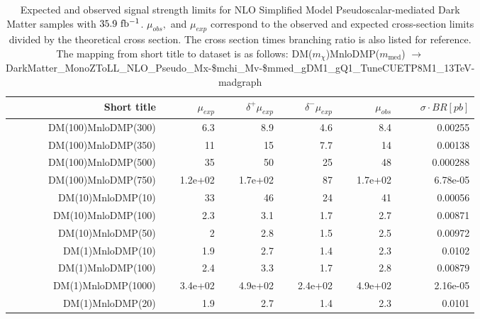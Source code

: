 \begin{table}[hbtp]
  \caption{
    Expected and observed signal strength limits for NLO Simplified Model Pseudoscalar-mediated Dark Matter samples with $35.9~\mathrm{fb^{-1}}$.
    $\mu_{obs},$ and $\mu_{exp}$ correspond to the observed and expected cross-section limits divided by the theoretical cross section.
    The cross section times branching ratio is also listed for reference.
    The mapping from short title to dataset is as follows:
    {\footnotesize DM($m_\chi$)MnloDMP($m_\mathrm{med}$) $\rightarrow$ DarkMatter\_MonoZToLL\_NLO\_Pseudo\_Mx-\$mchi\_Mv-\$mmed\_gDM1\_gQ1\_TuneCUETP8M1\_13TeV-madgraph }
  }
  \label{tab:pseudoscalar_limits}
  \begin{center}
{\footnotesize
  \begin{tabular}{rrrrrr}
\hline 
Short title               & $\mu_{exp}$  & $\delta^{+}\mu_{exp}$ & $\delta^{-}\mu_{exp}$ & $\mu_{obs}$  & $\sigma \cdot BR [pb]$ \\
\hline
DM(100)MnloDMP(300)       & 6.3          & 8.9          & 4.6          & 8.4          & 0.00255         \\
DM(100)MnloDMP(350)       & 11           & 15           & 7.7          & 14           & 0.00138         \\
DM(100)MnloDMP(500)       & 35           & 50           & 25           & 48           & 0.000288        \\
DM(100)MnloDMP(750)       & 1.2e+02      & 1.7e+02      & 87           & 1.7e+02      & 6.78e-05        \\
DM(10)MnloDMP(10)         & 33           & 46           & 24           & 41           & 0.00056         \\
DM(10)MnloDMP(100)        & 2.3          & 3.1          & 1.7          & 2.7          & 0.00871         \\
DM(10)MnloDMP(50)         & 2            & 2.8          & 1.5          & 2.5          & 0.00972         \\
DM(1)MnloDMP(10)          & 1.9          & 2.7          & 1.4          & 2.3          & 0.0102          \\
DM(1)MnloDMP(100)         & 2.4          & 3.3          & 1.7          & 2.8          & 0.00879         \\
DM(1)MnloDMP(1000)        & 3.4e+02      & 4.9e+02      & 2.4e+02      & 4.9e+02      & 2.16e-05        \\
DM(1)MnloDMP(20)          & 1.9          & 2.7          & 1.4          & 2.3          & 0.0101          \\

\end{tabular}}
\end{center}
\end{table}
